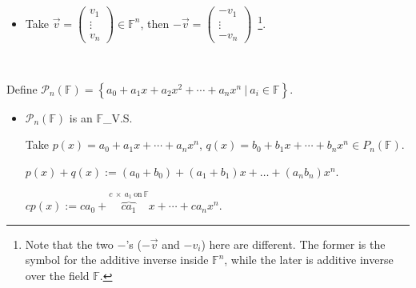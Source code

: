 \documentclass[11pt,fleqn]{book} %
\begin{document}
\begin{example}
\begin{itemize}
        \item Take $\vec{v} = \begin{pmatrix} v_1 \\ \vdots \\ v_n \end{pmatrix} \in \mathbb{F}^n$, then $-\vec{v} = \begin{pmatrix} -v_1 \\ \vdots \\ -v_n \end{pmatrix}$~\footnote{Note that the two $-$'s ($-\vec{v}$ and $-v_i$) here are different. The former is the symbol for the additive inverse inside $\mathbb{F}^n$, while the later is additive inverse over the field $\mathbb{F}$. }. 
    \end{itemize}
\end{example}

\begin{example}
{~~~}

    Define $\mathcal{P}_n(\mathbb{F}) = \left\{ a_0 + a_1x + a_2x^2 + \cdots + a_nx^n ~|~a_i \in \mathbb{F} \right\}$. 
    
    \begin{itemize}
        \item $\mathcal{P}_n(\mathbb{F})$ is an $\mathbb{F}$\_V.S. 
        
        Take $p(x) = a_0 + a_1x + \cdots + a_nx^n$, $q(x)=b_0 + b_1x + \cdots + b_nx^n \in P_n(\mathbb{F})$. 
        
        $p(x)+q(x):=(a_0+b_0)+(a_1+b_1)x+\dots+(a_nb_n)x^n$. 
        
        $cp(x) := ca_0 + \overbrace{ca_1}^{c ~\times~ a_1 \mathrm{~on~}\mathbb{F}}x + \cdots + ca_nx^n$. 
    \end{itemize}
\end{example}
\end{document}
